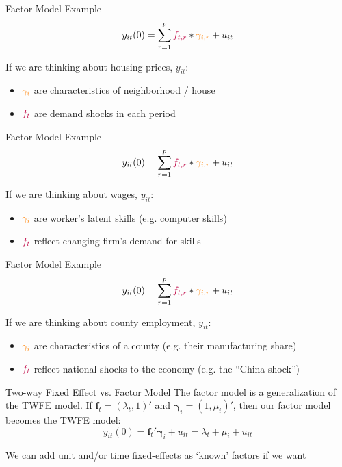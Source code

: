 \documentclass[aspectratio=169,t,11pt,table]{beamer}
\begin{document}
\begin{frame}{Factor Model Example}
  \vspace*{-\bigskipamount}
  $$
    y_{it}(0) = \sum_{r = 1}^{p} {\color{purple}f_{t,r}} * {\color{orange}\gamma_{i,r}} + u_{it}
  $$

  \bigskip
  If we are thinking about housing prices, $y_{it}$:
  \begin{itemize}
    \item ${\color{orange}\gamma_i}$ are characteristics of neighborhood / house
    \item ${\color{purple}f_{t}}$ are demand shocks in each period
  \end{itemize}
\end{frame}

\begin{frame}{Factor Model Example}
  \vspace*{-\bigskipamount}
  $$
    y_{it}(0) = \sum_{r = 1}^{p} {\color{purple}f_{t,r}} * {\color{orange}\gamma_{i,r}} + u_{it}
  $$

  \bigskip
  If we are thinking about wages, $y_{it}$:
  \begin{itemize}
    \item ${\color{orange}\gamma_i}$ are worker's latent skills (e.g. computer skills)
    \item ${\color{purple}f_{t}}$ reflect changing firm's demand for skills
  \end{itemize}
\end{frame}

\begin{frame}{Factor Model Example}
  \vspace*{-\bigskipamount}
  $$
    y_{it}(0) = \sum_{r = 1}^{p} {\color{purple}f_{t,r}} * {\color{orange}\gamma_{i,r}} + u_{it}
  $$

  \bigskip
  If we are thinking about county employment, $y_{it}$:
  \begin{itemize}
    \item ${\color{orange}\gamma_i}$ are characteristics of a county (e.g. their manufacturing share)
    \item ${\color{purple}f_{t}}$ reflect national shocks to the economy (e.g. the ``China shock'')
  \end{itemize}
\end{frame}

\begin{frame}{Two-way Fixed Effect vs. Factor Model}
  The factor model is a generalization of the TWFE model. If $\bm{f}_{t} = (\lambda_t, 1)'$ and $\bm{\gamma}_i = (1, \mu_i)'$, then our factor model becomes the TWFE model:
  $$
    y_{it}(0) = \bm{f}_t' \bm{\gamma}_i + u_{it} = \lambda_t + \mu_i + u_{it}
  $$
  
  \bigskip
  We can add unit and/or time fixed-effects as `known' factors if we want
\end{frame}
\end{document}
